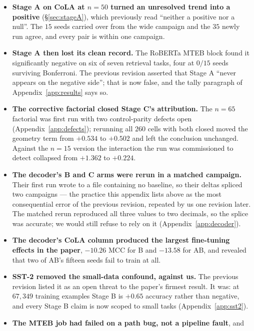 \documentclass{article}
\begin{document}
\begin{itemize}
\itemsep1pt
\item \textbf{Stage A on CoLA at $n=50$ turned an unresolved trend into a
      positive} (\S\ref{sec:stageA}), which previously read ``neither a positive
      nor a null''. The $15$ seeds carried over from the wide campaign and the
      $35$ newly run agree, and every pair is within one campaign.
\item \textbf{Stage A then lost its clean record.} The RoBERTa MTEB block found
      it significantly negative on six of seven retrieval tasks, four at $0/15$
      seeds surviving Bonferroni. The previous revision asserted that Stage A
      ``never appears on the negative side''; that is now false, and the tally
      paragraph of Appendix~\ref{app:results} says so.
\item \textbf{The corrective factorial closed Stage C's attribution.} The
      $n{=}65$ factorial was first run with two control-parity defects open
      (Appendix~\ref{app:defects}); rerunning all $260$ cells with both closed
      moved the geometry term from $+0.534$ to $+0.502$ and left the conclusion
      unchanged. Against the $n=15$ version the interaction the run was
      commissioned to detect collapsed from $+1.362$ to $+0.224$.
\item \textbf{The decoder's B and C arms were rerun in a matched campaign.}
      Their first run wrote to a file containing no baseline, so their deltas
      spliced two campaigns --- the practice this appendix lists above as the
      most consequential error of the previous revision, repeated by us one
      revision later. The matched rerun reproduced all three values to two
      decimals, so the splice was accurate; we would still refuse to rely on it
      (Appendix~\ref{app:decoder}).
\item \textbf{The decoder's CoLA column produced the largest fine-tuning effects
      in the paper}, $-10.26$ MCC for B and $-13.58$ for AB, and revealed that
      two of AB's fifteen seeds fail to train at all.
\item \textbf{SST-2 removed the small-data confound, against us.} The previous
      revision listed it as an open threat to the paper's firmest result. It
      was: at $67{,}349$ training examples Stage B is $+0.65$ accuracy rather
      than negative, and every Stage B claim is now scoped to small tasks
      (Appendix~\ref{app:sst2}).
\item \textbf{The MTEB job had failed on a path bug, not a pipeline fault}, and

\end{itemize}
\end{document}
